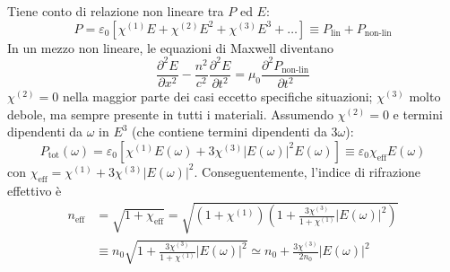 \documentclass[a4paper]{scrartcl}
\numberwithin{equation}{subsection}
\theoremstyle{style1}
\begin{document}
Tiene conto di relazione non lineare tra $P$ ed $E$:
\begin{equation}
	P = \varepsilon _0 \left[ \chi ^{(1)} E + \chi ^{(2)} E^2 + \chi ^{(3)} E^3 + \ldots \right] \equiv P_\text{lin}+ P_\text{non-lin}
\end{equation}
In un mezzo non lineare, le equazioni di Maxwell diventano
\begin{equation}
	\frac{\partial ^2 E}{\partial x^2} - \frac{n^2}{c^2}\frac{\partial ^2E}{\partial t^2} = \mu_0 \frac{\partial ^2 P_\text{non-lin}}{\partial t^2} 
\end{equation}
$\chi ^{(2)} =0$ nella maggior parte dei casi eccetto specifiche situazioni; $\chi ^{(3)} $ molto debole, ma sempre presente in tutti i materiali. Assumendo $\chi ^{(2)} =0$ e termini dipendenti da $\omega$ in $E^{3 } $ (che contiene termini dipendenti da $3\omega$):
\begin{equation}
	P_\text{tot}(\omega) = \varepsilon _0 \left[ \chi ^{(1)} E(\omega) + 3\chi ^{(3)} \left\lvert E(\omega) \right\rvert ^2 E(\omega) \right] \equiv \varepsilon _0 \chi _\text{eff} E(\omega) 
\end{equation}
con $\chi _\text{eff}= \chi ^{(1)} + 3\chi ^{(3)} \left\lvert E(\omega) \right\rvert ^2$. Conseguentemente, l'indice di rifrazione effettivo \`e 
\begin{equation}
	\begin{split}
		n_\text{eff}&=\sqrt{1+\chi _\text{eff}} = \sqrt{\left(1+ \chi ^{(1)} \right) \left(1+ \frac{3\chi ^{(3)} }{1+ \chi ^{(1)} } \left\lvert E(\omega) \right\rvert ^2\right) } \\
			    &\equiv n_0 \sqrt{1+ \frac{3\chi ^{(3)} }{1+\chi ^{(1)} } \left\lvert E(\omega)  \right\rvert ^2}\simeq n_0 + \frac{3\chi ^{(3)} }{2n_0}\left\lvert E(\omega) \right\rvert ^2 
	\end{split}
\end{equation}
\end{document}
